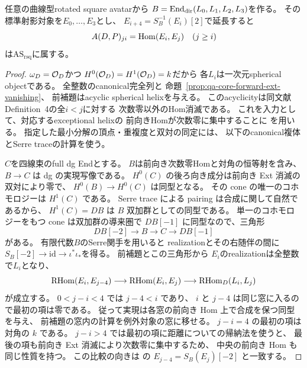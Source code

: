 \begin{proposition}
\label{prop:qa-as-helix-reconstruction}
任意の曲線型rotated square avatarから
$B=\operatorname{End}_{\mathrm{dir}}(L_0,L_1,L_2,L_3)$を作る。
その標準射影対象を$E_0,\ldots,E_3$とし、
$E_{i+4}=S_B^{-1}(E_i)[2]$で延長すると
\[
 A(D,P)_{ji}=\operatorname{Hom}(E_i,E_j)\quad(j\ge i)
\]
は$\mathrm{AS}_{\mathrm{rsq}}$に属する。
\end{proposition}
\begin{proof}
$\omega_D=\mathcal O_D$かつ
$H^0(\mathcal O_D)=H^1(\mathcal O_D)=k$だから
各$L_i$は一次元spherical objectである。
全整数のcanonical完全列と
命題~\ref{prop:qa-core-forward-ext-vanishing}、
前補題はacyclic spherical helixを与える。
このacyclicityは同文献Definition~4の全$i<j$に対する
次数零以外のHom消滅である。
これを入力として、対応するexceptional helixの
前向きHomが次数零に集中することに
\cite[Theorem 5]{OkawaUedaSpherical2020}を用いる。
指定した最小分解の頂点・重複度と双対の同定には、
以下のcanonical複体とSerre traceの計算を使う。

$C$を四線束のfull dg Endとする。
$B$は前向き次数零Homと対角の恒等射を含み、
$B\to C$ は dg の実現写像である。
$H^0(C)$ の後ろ向き成分は前向き Ext 消滅の双対により零で、
$H^0(B)\to H^0(C)$ は同型となる。
その cone の唯一のコホモロジーは $H^1(C)$ である。
Serre trace による pairing は合成に関して自然であるから、
$H^1(C)=DB$ は $B$ 双加群としての同型である。
単一のコホモロジーをもつ cone は双加群の導来圏で
$DB[-1]$ に同型なので、三角形
\begin{equation}
 DB[-2]\longrightarrow B\longrightarrow C
 \longrightarrow DB[-1]
 \label{eq:qa-as-dg-triangle}
\end{equation}
がある。
有限代数$B$のSerre関手を用いると
realizationとその右随伴の間に
$S_B[-2]\to\mathrm{id}\to\iota^*\iota_*$を得る。
前補題とこの三角形から
$E_i$のrealizationは全整数で$L_i$となり、
\begin{equation}
\operatorname{RHom}(E_i,E_{j-4})\longrightarrow
\operatorname{RHom}(E_i,E_j)\longrightarrow
\operatorname{RHom}_D(L_i,L_j)
\label{eq:qa-as-rhom-comparison}
\end{equation}
が成立する。
$0<j-i<4$ では $j-4<i$ であり、
$i$ と $j-4$ は同じ窓に入るので最初の項は零である。
従って実現は各窓の前向き Hom 上で合成を保つ同型を与え、
前補題の窓内の計算を例外対象の窓に移せる。
$j-i=4$ の最初の項は対角の $k$ である。
$j-i>4$ では最初の項に距離についての帰納法を使うと、
最後の項も前向き Ext 消滅により次数零に集中するため、
中央の前向き Hom も同じ性質を持つ。
この比較の向きは \cite[式 (9), (30)--(32)]{OkawaUedaSpherical2020}
の $E_{j-4}=S_B(E_j)[-2]$ と一致する。


\end{proof}
